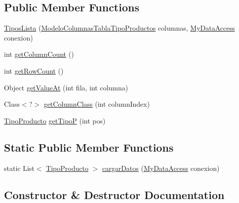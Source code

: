 \subsection*{Public Member Functions}
\begin{DoxyCompactItemize}
\item 
\mbox{\hyperlink{classtipo_productos_1_1_tipos_lista_a75e4a1ac3bcb6d64c3fc5dbae72e85c5}{Tipos\+Lista}} (\mbox{\hyperlink{classtipo_productos_1_1_modelo_columnas_tabla_tipo_productos}{Modelo\+Columnas\+Tabla\+Tipo\+Productos}} columnas, \mbox{\hyperlink{classconexion_s_q_l_1_1_my_data_access}{My\+Data\+Access}} conexion)
\item 
int \mbox{\hyperlink{classtipo_productos_1_1_tipos_lista_ae09ef2d57d7c7989d4e0e99463294761}{get\+Column\+Count}} ()
\item 
int \mbox{\hyperlink{classtipo_productos_1_1_tipos_lista_a619180cf0e73dd687d83511c805b0a7d}{get\+Row\+Count}} ()
\item 
Object \mbox{\hyperlink{classtipo_productos_1_1_tipos_lista_a78deb10c0cd2fbc2dfa0de19054e033e}{get\+Value\+At}} (int fila, int columna)
\item 
Class$<$?$>$ \mbox{\hyperlink{classtipo_productos_1_1_tipos_lista_a87b924c7d8f72e7615286c41d19c2589}{get\+Column\+Class}} (int column\+Index)
\item 
\mbox{\hyperlink{classtipo_productos_1_1_tipo_producto}{Tipo\+Producto}} \mbox{\hyperlink{classtipo_productos_1_1_tipos_lista_a825bd94b7e40672ab7d3a84083c21245}{get\+TipoP}} (int pos)
\end{DoxyCompactItemize}
\subsection*{Static Public Member Functions}
\begin{DoxyCompactItemize}
\item 
static List$<$ \mbox{\hyperlink{classtipo_productos_1_1_tipo_producto}{Tipo\+Producto}} $>$ \mbox{\hyperlink{classtipo_productos_1_1_tipos_lista_ad36441dd4c32340b0905b5d30b91fcb4}{cargar\+Datos}} (\mbox{\hyperlink{classconexion_s_q_l_1_1_my_data_access}{My\+Data\+Access}} conexion)
\end{DoxyCompactItemize}


\subsection{Constructor \& Destructor Documentation}
\mbox{\label{classtipo_productos_1_1_tipos_lista_a75e4a1ac3bcb6d64c3fc5dbae72e85c5}} 
